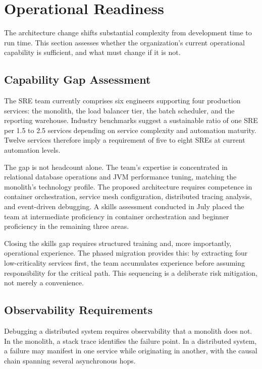 \section{Operational Readiness}

The architecture change shifts substantial complexity from development time to run time. This section assesses whether the organization's current operational capability is sufficient, and what must change if it is not.

\subsection{Capability Gap Assessment}

The SRE team currently comprises six engineers supporting four production services: the monolith, the load balancer tier, the batch scheduler, and the reporting warehouse. Industry benchmarks suggest a sustainable ratio of one SRE per 1.5 to 2.5 services depending on service complexity and automation maturity. Twelve services therefore imply a requirement of five to eight SREs at current automation levels.

The gap is not headcount alone. The team's expertise is concentrated in relational database operations and JVM performance tuning, matching the monolith's technology profile. The proposed architecture requires competence in container orchestration, service mesh configuration, distributed tracing analysis, and event-driven debugging. A skills assessment conducted in July placed the team at intermediate proficiency in container orchestration and beginner proficiency in the remaining three areas.

Closing the skills gap requires structured training and, more importantly, operational experience. The phased migration provides this: by extracting four low-criticality services first, the team accumulates experience before assuming responsibility for the critical path. This sequencing is a deliberate risk mitigation, not merely a convenience.

\subsection{Observability Requirements}

Debugging a distributed system requires observability that a monolith does not. In the monolith, a stack trace identifies the failure point. In a distributed system, a failure may manifest in one service while originating in another, with the causal chain spanning several asynchronous hops.


